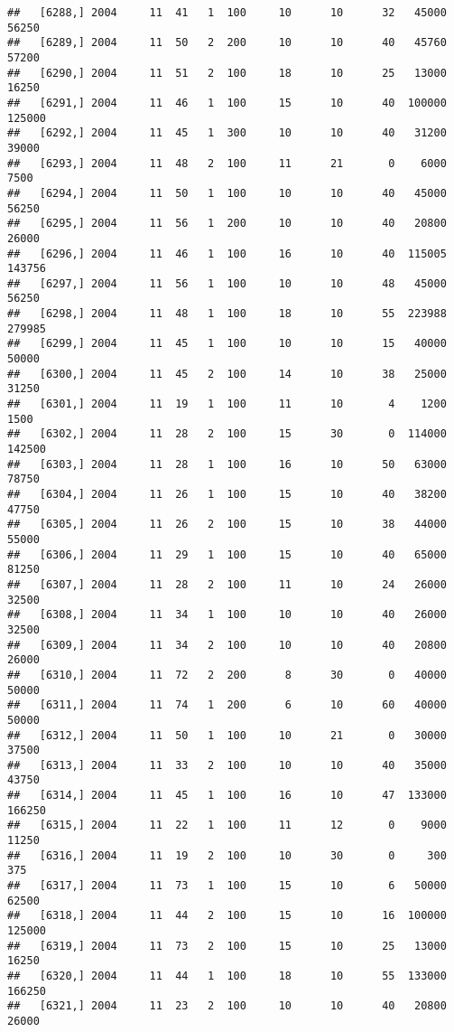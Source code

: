 \documentclass{article}\usepackage[]{graphicx}\usepackage[]{color}
\makeatletter
\newenvironment{kframe}{%
 \def\at@end@of@kframe{}%
 \ifinner\ifhmode%
  \def\at@end@of@kframe{\end{minipage}}%
  \begin{minipage}{\columnwidth}%
 \fi\fi%
 \def\FrameCommand##1{\hskip\@totalleftmargin \hskip-\fboxsep
 \colorbox{shadecolor}{##1}\hskip-\fboxsep
     \hskip-\linewidth \hskip-\@totalleftmargin \hskip\columnwidth}%
 \MakeFramed {\advance\hsize-\width
   \@totalleftmargin\z@ \linewidth\hsize
   \@setminipage}}%
 {\par\unskip\endMakeFramed%
 \at@end@of@kframe}
\newenvironment{knitrout}{}{} %
\makeatother
\begin{document}
\begin{knitrout}
\begin{kframe}
\begin{verbatim}
##   [6288,] 2004     11  41   1  100     10      10      32   45000   56250
##   [6289,] 2004     11  50   2  200     10      10      40   45760   57200
##   [6290,] 2004     11  51   2  100     18      10      25   13000   16250
##   [6291,] 2004     11  46   1  100     15      10      40  100000  125000
##   [6292,] 2004     11  45   1  300     10      10      40   31200   39000
##   [6293,] 2004     11  48   2  100     11      21       0    6000    7500
##   [6294,] 2004     11  50   1  100     10      10      40   45000   56250
##   [6295,] 2004     11  56   1  200     10      10      40   20800   26000
##   [6296,] 2004     11  46   1  100     16      10      40  115005  143756
##   [6297,] 2004     11  56   1  100     10      10      48   45000   56250
##   [6298,] 2004     11  48   1  100     18      10      55  223988  279985
##   [6299,] 2004     11  45   1  100     10      10      15   40000   50000
##   [6300,] 2004     11  45   2  100     14      10      38   25000   31250
##   [6301,] 2004     11  19   1  100     11      10       4    1200    1500
##   [6302,] 2004     11  28   2  100     15      30       0  114000  142500
##   [6303,] 2004     11  28   1  100     16      10      50   63000   78750
##   [6304,] 2004     11  26   1  100     15      10      40   38200   47750
##   [6305,] 2004     11  26   2  100     15      10      38   44000   55000
##   [6306,] 2004     11  29   1  100     15      10      40   65000   81250
##   [6307,] 2004     11  28   2  100     11      10      24   26000   32500
##   [6308,] 2004     11  34   1  100     10      10      40   26000   32500
##   [6309,] 2004     11  34   2  100     10      10      40   20800   26000
##   [6310,] 2004     11  72   2  200      8      30       0   40000   50000
##   [6311,] 2004     11  74   1  200      6      10      60   40000   50000
##   [6312,] 2004     11  50   1  100     10      21       0   30000   37500
##   [6313,] 2004     11  33   2  100     10      10      40   35000   43750
##   [6314,] 2004     11  45   1  100     16      10      47  133000  166250
##   [6315,] 2004     11  22   1  100     11      12       0    9000   11250
##   [6316,] 2004     11  19   2  100     10      30       0     300     375
##   [6317,] 2004     11  73   1  100     15      10       6   50000   62500
##   [6318,] 2004     11  44   2  100     15      10      16  100000  125000
##   [6319,] 2004     11  73   2  100     15      10      25   13000   16250
##   [6320,] 2004     11  44   1  100     18      10      55  133000  166250
##   [6321,] 2004     11  23   2  100     10      10      40   20800   26000

\end{verbatim}
\end{kframe}
\end{knitrout}
\end{document}
